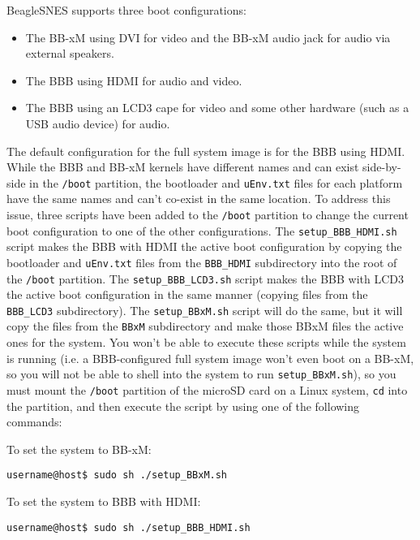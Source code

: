BeagleSNES supports three boot configurations:
\begin{itemize}
\item The BB-xM using DVI for video and the BB-xM audio jack for audio via external speakers.
\item The BBB using HDMI for audio and video.
\item The BBB using an LCD3 cape for video and some other hardware (such as a USB audio device) for audio.
\end{itemize}
The default configuration for the full system image is for the BBB using HDMI.  While the BBB and BB-xM kernels have different names and can exist side-by-side in the \texttt{/boot} partition, the bootloader and \texttt{uEnv.txt} files for each platform have the same names and can't co-exist in the same location.  To address this issue, three scripts have been added to the \texttt{/boot} partition to change the current boot configuration to one of the other configurations.  The \texttt{setup\_BBB\_HDMI.sh} script makes the BBB with HDMI the active boot configuration by copying the bootloader and \texttt{uEnv.txt} files from the \texttt{BBB\_HDMI} subdirectory into the root of the \texttt{/boot} partition.  The \texttt{setup\_BBB\_LCD3.sh} script makes the BBB with LCD3 the active boot configuration in the same manner (copying files from the \texttt{BBB\_LCD3} subdirectory).  The \texttt{setup\_BBxM.sh} script will do the same, but it will copy the files from the \texttt{BBxM} subdirectory and make those BBxM files the active ones for the system.  You won't be able to execute these scripts while the system is running (i.e. a BBB-configured full system image won't even boot on a BB-xM, so you will not be able to shell into the system to run \texttt{setup\_BBxM.sh}), so you must mount the \texttt{/boot} partition of the microSD card on a Linux system, \texttt{cd} into the partition, and then execute the script by using one of the following commands:

To set the system to BB-xM: 

\begin{commandBox}
\texttt{username@host\$  sudo sh ./setup\_BBxM.sh}
\end{commandBox}

To set the system to BBB with HDMI: 

\begin{commandBox}
\texttt{username@host\$  sudo sh ./setup\_BBB\_HDMI.sh}
\end{commandBox}

